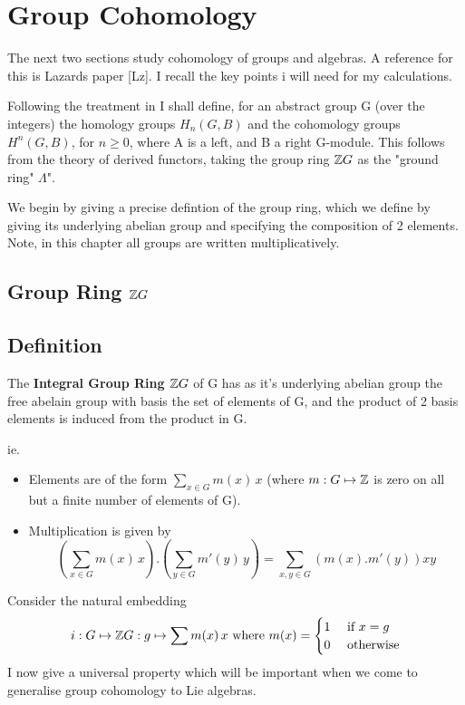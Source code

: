 \section{Group Cohomology}

The next two sections study cohomology of groups and algebras. A
reference for this is Lazards paper [Lz]. I
recall the key points i will need for my calculations.

Following the treatment in \cite{HS} I shall define, for an
abstract group G (over the integers) the homology groups
$H_n(G,B)$ and the cohomology groups $H^n(G,B)$, for $n\geq 0$,
where A is a left, and B a right G-module. This follows from the
theory of derived functors, taking the group ring $\mathbb Z G$ as the
"ground ring" $\Lambda$".

We begin by giving a precise defintion of the group ring, which we
define by giving its underlying abelian group and specifying the
composition of 2 elements. Note, in this chapter all groups are
written multiplicatively.

\subsection{Group Ring $\mathbb Z G$}\label{df3.1}
\subsection{Definition}\label{df3.1.1}
The \textbf{Integral Group Ring $\mathbb Z G$} of G has as it's
underlying abelian group the free abelain group with basis the set
of elements of G, and the product of 2 basis elements is induced
from the product in G.

ie.
\begin{itemize}
    \item Elements are of the form $\sum_{x\in G} m(x)\, x$ (where
    $m:G\mapsto \mathbb Z$ is zero on all but a finite number of elements
    of G).
    \item Multiplication is given by
    $$ \left ( \sum_{x\in G} m(x)\, x \right ). \left (\sum_{y\in G} m'(y)\,
    y\right ) = \sum_{x,y \in G} (m(x).m'(y))xy$$
\end{itemize}

Consider the natural embedding
$$i:G\mapsto \mathbb Z G:g\mapsto \sum
m(x)\, x\text{ where }m(x) = 
\begin{cases}
  1 & \text{ if } x=g \\
  0 & \text{ otherwise}
\end{cases}$$
 I now give a universal property which will be
important when we come to generalise group cohomology to Lie
algebras.

